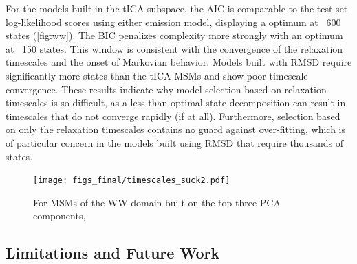 \documentclass[journal=jpcbfk, layout=traditional, manuscript=article]{achemso}
\begin{document}
For the models built in the tICA subspace, the AIC is comparable to the test set log-likelihood scores using either emission model, displaying a optimum at ~600 states (\cref{fig:ww}). The BIC penalizes complexity more strongly with an optimum at ~150 states. This window is consistent with the convergence of the relaxation timescales and the onset of Markovian behavior. Models built with RMSD require significantly more states than the tICA MSMs and show poor timescale convergence. These results indicate why model selection based on relaxation timescales is so difficult, as a less than optimal state decomposition can result in timescales that do not converge rapidly (if at all). Furthermore, selection based on only the relaxation timescales contains no guard against over-fitting, which is of particular concern in the models built using RMSD that require thousands of states.

\begin{figure}
\centering
\texttt{[image: figs\_final/timescales\_suck2.pdf]}
\caption{For MSMs of the WW domain built on the top three PCA components,} 
\end{figure}


\subsection{Limitations and Future Work}
\end{document}
